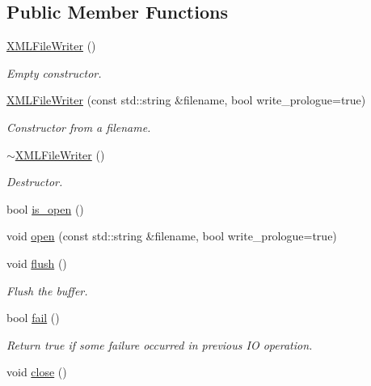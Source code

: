 \subsection*{Public Member Functions}
\begin{DoxyCompactItemize}
\item 
\mbox{\hyperlink{classADATXML_1_1XMLFileWriter_a40db177b66a4598583a3a08e19c1e927}{X\+M\+L\+File\+Writer}} ()
\begin{DoxyCompactList}\small\item\em Empty constructor. \end{DoxyCompactList}\item 
\mbox{\hyperlink{classADATXML_1_1XMLFileWriter_a83cf749ff969a30d3de1895f271b238a}{X\+M\+L\+File\+Writer}} (const std\+::string \&filename, bool write\+\_\+prologue=true)
\begin{DoxyCompactList}\small\item\em Constructor from a filename. \end{DoxyCompactList}\item 
\mbox{\hyperlink{classADATXML_1_1XMLFileWriter_af3d1109d92631884682eac46624ca7fd}{$\sim$\+X\+M\+L\+File\+Writer}} ()
\begin{DoxyCompactList}\small\item\em Destructor. \end{DoxyCompactList}\item 
bool \mbox{\hyperlink{classADATXML_1_1XMLFileWriter_a60fa87bbd9300c37386f9fdcb9460f74}{is\+\_\+open}} ()
\item 
void \mbox{\hyperlink{classADATXML_1_1XMLFileWriter_a76f52e7ccdfe3b82875f30953cfd2447}{open}} (const std\+::string \&filename, bool write\+\_\+prologue=true)
\item 
void \mbox{\hyperlink{classADATXML_1_1XMLFileWriter_a63097bd3fafbcf99804b4106700b524d}{flush}} ()
\begin{DoxyCompactList}\small\item\em Flush the buffer. \end{DoxyCompactList}\item 
bool \mbox{\hyperlink{classADATXML_1_1XMLFileWriter_a0294354e26b7ad1be1ca75f470db4788}{fail}} ()
\begin{DoxyCompactList}\small\item\em Return true if some failure occurred in previous IO operation. \end{DoxyCompactList}\item 
void \mbox{\hyperlink{classADATXML_1_1XMLFileWriter_a1a51ceb51781ac6f3a476dcf99a75017}{close}} ()

\end{DoxyCompactItemize}
